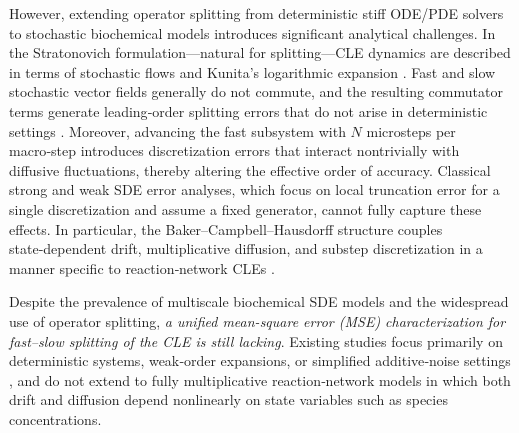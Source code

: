 \documentclass{article}
\begin{document}
However, extending operator splitting from deterministic stiff ODE/PDE solvers
to stochastic biochemical models introduces significant analytical challenges.
 In the Stratonovich formulation—natural for splitting—CLE dynamics are described in terms of stochastic flows and Kunita’s logarithmic expansion \cite{kunita1990stochastic,kunita2006stochastic}. 
Fast and slow stochastic vector fields generally do not commute, and the resulting commutator terms generate leading‑order splitting errors that do not arise in deterministic settings \cite{rossler2010runge}.  
Moreover, advancing the fast subsystem with $N$ microsteps  per macro‑step introduces discretization errors that interact nontrivially with diffusive fluctuations, thereby altering the effective order of accuracy.
Classical strong and weak SDE error analyses, which focus on local truncation error for a single discretization and assume a fixed generator, cannot fully capture these effects. 
In particular, the Baker–Campbell–Hausdorff structure couples state‑dependent drift, multiplicative diffusion, and substep discretization in a manner specific to reaction‑network CLEs
\cite{castell1993asymptotic,malham2008stochastic}.

Despite the prevalence of multiscale biochemical SDE models and the widespread use of operator splitting, \emph{a unified mean-square error (MSE) characterization for fast–slow splitting of the CLE is still lacking}.  
Existing studies focus primarily on deterministic systems, weak‑order expansions, or simplified additive‑noise settings \cite{kulchitski2000unified,Misawa2000,strang1968construction,liu2022convergence,kloeden1977numerical}, and do not extend to fully multiplicative reaction‑network models in which both drift and diffusion depend nonlinearly on state variables such as species concentrations.

\end{document}
